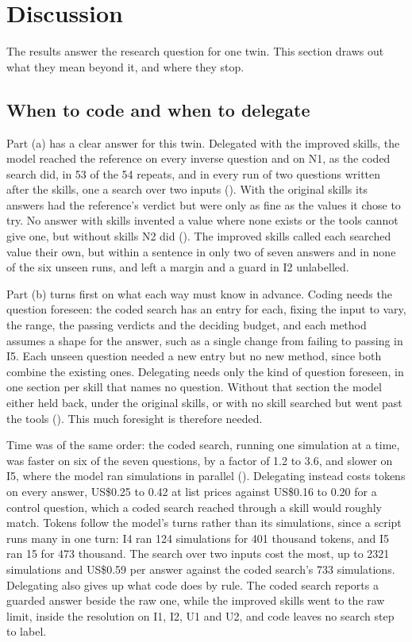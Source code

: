   \section{Discussion}
  \label{sec:discussion}

  The results answer the research question for one twin. This section draws out what they mean
  beyond it, and where they stop.

  \subsection{When to code and when to delegate}
  \label{sec:build-or-ask}

  Part (a) has a clear answer for this twin. Delegated with the improved skills, the model reached
  the reference on every inverse question and on N1, as the coded search did, in 53 of the 54
  repeats, and in every run of two questions written after the skills, one a search over two inputs
  (). With the original skills its answers had the reference's verdict
  but were only as fine as the values it chose to try. No answer with skills invented a value where
  none exists or the tools cannot give one, but without skills N2 did
  (). The improved skills called each searched value their own, but
  within a sentence in only two of seven answers and in none of the six unseen runs, and left a
  margin and a guard in I2 unlabelled.

  Part (b) turns first on what each way must know in advance. Coding needs the question foreseen:
  the coded search has an entry for each, fixing the input to vary, the range, the passing verdicts
  and the deciding budget, and each method assumes a shape for the answer, such as a single change
  from failing to passing in I5. Each unseen question needed a new entry but no new method, since
  both combine the existing ones. Delegating needs only the kind of question foreseen, in one
  section per skill that names no question. Without that section the model either held back, under
  the original skills, or with no skill searched but went past the tools ().
  This much foresight is therefore needed.

  Time was of the same order: the coded search, running one simulation at a time, was faster on six
  of the seven questions, by a factor of 1.2 to 3.6, and slower on I5, where the model ran
  simulations in parallel (). Delegating instead costs tokens on every
  answer, US\$0.25 to 0.42 at list prices against US\$0.16 to 0.20 for a control question, which
  a coded search reached through a skill would roughly match. Tokens follow the model's turns
  rather than its simulations, since a script runs many in one turn: I4 ran 124 simulations for
  401 thousand tokens, and I5 ran 15 for 473 thousand. The search over two inputs cost the most,
  up to 2321 simulations and US\$0.59 per answer against the coded search's 733 simulations.
  Delegating also gives up what code does by rule. The coded search reports a guarded answer
  beside the raw one, while the improved skills went to the raw limit, inside the resolution on
  I1, I2, U1 and U2, and code leaves no search step to label.

